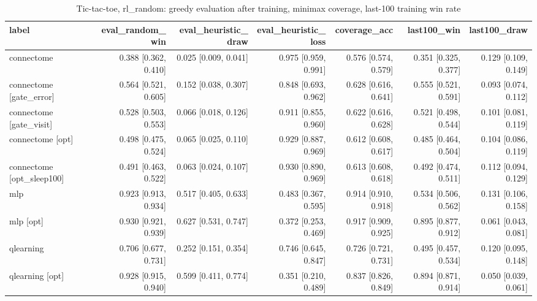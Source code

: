 \begin{table}[t]
\centering
\small
\begin{tabular}{lrrrrrr}
\toprule
label & eval\_random\_win & eval\_heuristic\_draw & eval\_heuristic\_loss & coverage\_acc & last100\_win & last100\_draw \\
\midrule
connectome & 0.388 [0.362, 0.410] & 0.025 [0.009, 0.041] & 0.975 [0.959, 0.991] & 0.576 [0.574, 0.579] & 0.351 [0.325, 0.377] & 0.129 [0.109, 0.149] \\
connectome [gate\_error] & 0.564 [0.521, 0.605] & 0.152 [0.038, 0.307] & 0.848 [0.693, 0.962] & 0.628 [0.616, 0.641] & 0.555 [0.521, 0.591] & 0.093 [0.074, 0.112] \\
connectome [gate\_visit] & 0.528 [0.503, 0.553] & 0.066 [0.018, 0.126] & 0.911 [0.855, 0.960] & 0.622 [0.616, 0.628] & 0.521 [0.498, 0.544] & 0.101 [0.081, 0.119] \\
connectome [opt] & 0.498 [0.475, 0.524] & 0.065 [0.025, 0.110] & 0.929 [0.887, 0.969] & 0.612 [0.608, 0.617] & 0.485 [0.464, 0.504] & 0.104 [0.086, 0.119] \\
connectome [opt\_sleep100] & 0.491 [0.463, 0.522] & 0.063 [0.024, 0.107] & 0.930 [0.890, 0.969] & 0.613 [0.608, 0.618] & 0.492 [0.474, 0.511] & 0.112 [0.094, 0.129] \\
mlp & 0.923 [0.913, 0.934] & 0.517 [0.405, 0.633] & 0.483 [0.367, 0.595] & 0.914 [0.910, 0.918] & 0.534 [0.506, 0.562] & 0.131 [0.106, 0.158] \\
mlp [opt] & 0.930 [0.921, 0.939] & 0.627 [0.531, 0.747] & 0.372 [0.253, 0.469] & 0.917 [0.909, 0.925] & 0.895 [0.877, 0.912] & 0.061 [0.043, 0.081] \\
qlearning & 0.706 [0.677, 0.731] & 0.252 [0.151, 0.354] & 0.746 [0.645, 0.847] & 0.726 [0.721, 0.731] & 0.495 [0.457, 0.534] & 0.120 [0.095, 0.148] \\
qlearning [opt] & 0.928 [0.915, 0.940] & 0.599 [0.411, 0.774] & 0.351 [0.210, 0.489] & 0.837 [0.826, 0.849] & 0.894 [0.871, 0.914] & 0.050 [0.039, 0.061] \\
\bottomrule
\end{tabular}
\caption{Tic-tac-toe, rl\_random: greedy evaluation after training, minimax coverage, last-100 training win rate}
\label{tab:tictactoe_rl_random}
\end{table}